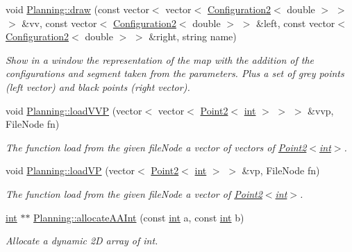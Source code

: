 \begin{DoxyCompactItemize}
void \mbox{\hyperlink{namespace_planning_a86b12372b440be1858c26eb256586d98}{Planning\+::draw}} (const vector$<$ vector$<$ \mbox{\hyperlink{class_configuration2}{Configuration2}}$<$ double $>$ $>$ $>$ \&vv, const vector$<$ \mbox{\hyperlink{class_configuration2}{Configuration2}}$<$ double $>$ $>$ \&left, const vector$<$ \mbox{\hyperlink{class_configuration2}{Configuration2}}$<$ double $>$ $>$ \&right, string name)
\begin{DoxyCompactList}\small\item\em Show in a window the representation of the map with the addition of the configurations and segment taken from the parameters. Plus a set of grey points (left vector) and black points (right vector). \end{DoxyCompactList}\item 
void \mbox{\hyperlink{namespace_planning_a927f4df9eaa7ed3d75f0c410b668f72c}{Planning\+::load\+V\+VP}} (vector$<$ vector$<$ \mbox{\hyperlink{class_point2}{Point2}}$<$ \mbox{\hyperlink{draw_8hh_aa620a13339ac3a1177c86edc549fda9b}{int}} $>$ $>$ $>$ \&vvp, File\+Node fn)
\begin{DoxyCompactList}\small\item\em The function load from the given file\+Node a vector of vectors of \mbox{\hyperlink{class_point2}{Point2$<$int$>$}}. \end{DoxyCompactList}\item 
void \mbox{\hyperlink{namespace_planning_a07837e248f45a8a62555c6e16b94d9f3}{Planning\+::load\+VP}} (vector$<$ \mbox{\hyperlink{class_point2}{Point2}}$<$ \mbox{\hyperlink{draw_8hh_aa620a13339ac3a1177c86edc549fda9b}{int}} $>$ $>$ \&vp, File\+Node fn)
\begin{DoxyCompactList}\small\item\em The function load from the given file\+Node a vector of \mbox{\hyperlink{class_point2}{Point2$<$int$>$}}. \end{DoxyCompactList}\item 
\mbox{\hyperlink{draw_8hh_aa620a13339ac3a1177c86edc549fda9b}{int}} $\ast$$\ast$ \mbox{\hyperlink{namespace_planning_ab0dac0907f2f18ba6bb0b6f43be68582}{Planning\+::allocate\+A\+A\+Int}} (const \mbox{\hyperlink{draw_8hh_aa620a13339ac3a1177c86edc549fda9b}{int}} a, const \mbox{\hyperlink{draw_8hh_aa620a13339ac3a1177c86edc549fda9b}{int}} b)
\begin{DoxyCompactList}\small\item\em Allocate a dynamic 2D array of int. \end{DoxyCompactList}\item 
$$
\end{DoxyCompactItemize}
